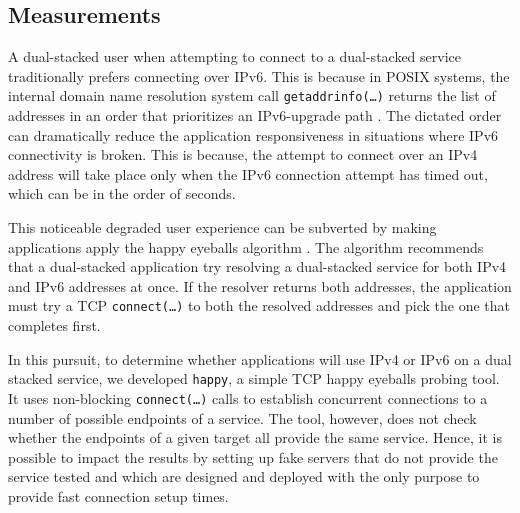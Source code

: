 \subsection{Measurements}

A dual-stacked user when attempting to connect to a dual-stacked service
traditionally prefers connecting over IPv6. This is because in POSIX systems,
the internal domain name resolution system call \texttt{getaddrinfo(\ldots)}
\cite{rfc3493} returns the list of addresses in an order that prioritizes an
IPv6-upgrade path \cite{rfc6724}. The dictated order can dramatically reduce
the application responsiveness in situations where IPv6 connectivity is
broken. This is because, the attempt to connect over an IPv4 address will take
place only when the IPv6 connection attempt has timed out, which can be in the
order of seconds.

This noticeable degraded user experience can be subverted by making
applications apply the happy eyeballs algorithm \cite{rfc6555}. The algorithm
recommends that a dual-stacked application try resolving a dual-stacked
service for both IPv4 and IPv6 addresses at once. If the resolver returns both
addresses, the application must try a TCP \texttt{connect(\ldots)} to both the
resolved addresses and pick the one that completes first.

In this pursuit, to determine whether applications will use IPv4 or IPv6 on a
dual stacked service, we developed \texttt{happy}, a simple TCP happy eyeballs
probing tool. It uses non-blocking \texttt{connect(\ldots)} calls to establish
concurrent connections to a number of possible endpoints of a service. The
tool, however, does not check whether the endpoints of a given target all
provide the same service. Hence, it is possible to impact the results by
setting up fake servers that do not provide the service tested and which are
designed and deployed with the only purpose to provide fast connection setup
times.

